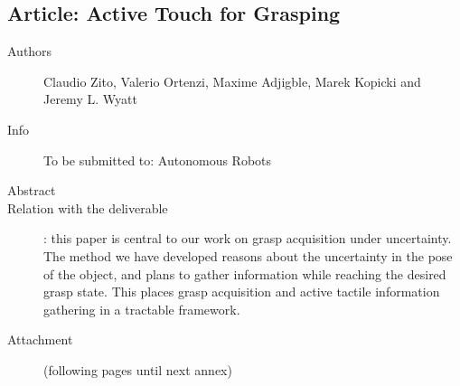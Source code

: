 \documentclass[a4paper,11pt,pdf]{pacmanreport}
\begin{document}
\subsection{Article: Active Touch for Grasping}
\label{ann:activetouch}
\begin{description}
    \item[Authors] Claudio Zito, Valerio Ortenzi, Maxime Adjigble, Marek Kopicki and Jeremy L. Wyatt
    \item[Info] To be submitted to: Autonomous Robots
    \item[Abstract]
    \item[Relation with the deliverable]: this paper is central to our work on grasp acquisition under uncertainty. The method we have developed reasons about the uncertainty in the pose of the object, and plans to gather information while reaching the desired grasp state. This places grasp acquisition and active tactile information gathering in a tractable framework.
    \item[Attachment] (following pages until next annex)
\end{description}
%
\end{document}

